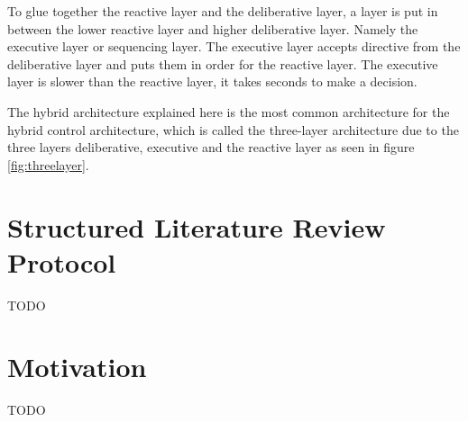 To glue together the reactive layer and the deliberative layer, a layer is put in between the lower reactive layer and higher deliberative layer. Namely the executive layer or sequencing layer. The executive layer accepts directive from the deliberative layer and puts them in order for the reactive layer. The executive layer is slower than the reactive layer, it takes seconds to make a decision.

The hybrid architecture explained here is the most common architecture for the hybrid control architecture, which is called the three-layer architecture due to the three layers deliberative, executive and the reactive layer as seen in figure \ref{fig:threelayer}.


\section{Structured Literature Review Protocol}
TODO



\section{Motivation}
\label{sec:motivation}
TODO



